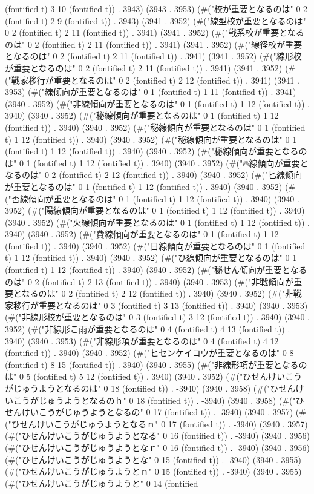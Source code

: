 (fontified t) 3 10 (fontified t)) . 3943) (3943 . 3953) (#("校が重要となるのは" 0 2 (fontified t) 2 9 (fontified t)) . 3943) (3941 . 3952) (#("線型校が重要となるのは" 0 2 (fontified t) 2 11 (fontified t)) . 3941) (3941 . 3952) (#("戦系校が重要となるのは" 0 2 (fontified t) 2 11 (fontified t)) . 3941) (3941 . 3952) (#("線径校が重要となるのは" 0 2 (fontified t) 2 11 (fontified t)) . 3941) (3941 . 3952) (#("線形校が重要となるのは" 0 2 (fontified t) 2 11 (fontified t)) . 3941) (3941 . 3952) (#("戦家移行が重要となるのは" 0 2 (fontified t) 2 12 (fontified t)) . 3941) (3941 . 3953) (#("線傾向が重要となるのは" 0 1 (fontified t) 1 11 (fontified t)) . 3941) (3940 . 3952) (#("非線傾向が重要となるのは" 0 1 (fontified t) 1 12 (fontified t)) . 3940) (3940 . 3952) (#("秘線傾向が重要となるのは" 0 1 (fontified t) 1 12 (fontified t)) . 3940) (3940 . 3952) (#("秘線傾向が重要となるのは" 0 1 (fontified t) 1 12 (fontified t)) . 3940) (3940 . 3952) (#("秘線傾向が重要となるのは" 0 1 (fontified t) 1 12 (fontified t)) . 3940) (3940 . 3952) (#("秘線傾向が重要となるのは" 0 1 (fontified t) 1 12 (fontified t)) . 3940) (3940 . 3952) (#("🔥線傾向が重要となるのは" 0 2 (fontified t) 2 12 (fontified t)) . 3940) (3940 . 3952) (#("匕線傾向が重要となるのは" 0 1 (fontified t) 1 12 (fontified t)) . 3940) (3940 . 3952) (#("否線傾向が重要となるのは" 0 1 (fontified t) 1 12 (fontified t)) . 3940) (3940 . 3952) (#("陽線傾向が重要となるのは" 0 1 (fontified t) 1 12 (fontified t)) . 3940) (3940 . 3952) (#("火線傾向が重要となるのは" 0 1 (fontified t) 1 12 (fontified t)) . 3940) (3940 . 3952) (#("費線傾向が重要となるのは" 0 1 (fontified t) 1 12 (fontified t)) . 3940) (3940 . 3952) (#("日線傾向が重要となるのは" 0 1 (fontified t) 1 12 (fontified t)) . 3940) (3940 . 3952) (#("ひ線傾向が重要となるのは" 0 1 (fontified t) 1 12 (fontified t)) . 3940) (3940 . 3952) (#("秘せん傾向が重要となるのは" 0 2 (fontified t) 2 13 (fontified t)) . 3940) (3940 . 3953) (#("非戦傾向が重要となるのは" 0 2 (fontified t) 2 12 (fontified t)) . 3940) (3940 . 3952) (#("非戦家移行が重要となるのは" 0 3 (fontified t) 3 13 (fontified t)) . 3940) (3940 . 3953) (#("非線形校が重要となるのは" 0 3 (fontified t) 3 12 (fontified t)) . 3940) (3940 . 3952) (#("非線形こ雨が重要となるのは" 0 4 (fontified t) 4 13 (fontified t)) . 3940) (3940 . 3953) (#("非線形項が重要となるのは" 0 4 (fontified t) 4 12 (fontified t)) . 3940) (3940 . 3952) (#("ヒセンケイコウが重要となるのは" 0 8 (fontified t) 8 15 (fontified t)) . 3940) (3940 . 3955) (#("非線形項が重要となるのは" 0 5 (fontified t) 5 12 (fontified t)) . 3940) (3940 . 3952) (#("ひせんけいこうがじゅうようとなるのは" 0 18 (fontified t)) . -3940) (3940 . 3958) (#("ひせんけいこうがじゅうようとなるのｈ" 0 18 (fontified t)) . -3940) (3940 . 3958) (#("ひせんけいこうがじゅうようとなるの" 0 17 (fontified t)) . -3940) (3940 . 3957) (#("ひせんけいこうがじゅうようとなるｎ" 0 17 (fontified t)) . -3940) (3940 . 3957) (#("ひせんけいこうがじゅうようとなる" 0 16 (fontified t)) . -3940) (3940 . 3956) (#("ひせんけいこうがじゅうようとなｒ" 0 16 (fontified t)) . -3940) (3940 . 3956) (#("ひせんけいこうがじゅうようとな" 0 15 (fontified t)) . -3940) (3940 . 3955) (#("ひせんけいこうがじゅうようとｎ" 0 15 (fontified t)) . -3940) (3940 . 3955) (#("ひせんけいこうがじゅうようと" 0 14 (fontified 